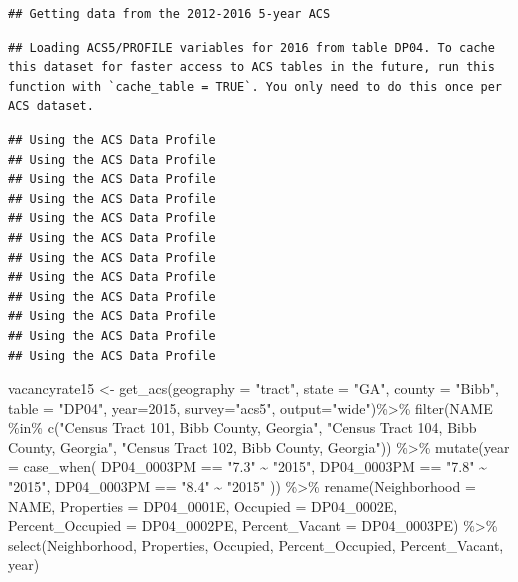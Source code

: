 \documentclass[
]{article}
\newenvironment{Shaded}{\begin{snugshade}}{\end{snugshade}}
\newcommand{\AttributeTok}[1]{\textcolor[rgb]{0.77,0.63,0.00}{#1}}
\newcommand{\DecValTok}[1]{\textcolor[rgb]{0.00,0.00,0.81}{#1}}
\newcommand{\FunctionTok}[1]{\textcolor[rgb]{0.00,0.00,0.00}{#1}}
\newcommand{\NormalTok}[1]{#1}
\newcommand{\OtherTok}[1]{\textcolor[rgb]{0.56,0.35,0.01}{#1}}
\newcommand{\SpecialCharTok}[1]{\textcolor[rgb]{0.00,0.00,0.00}{#1}}
\newcommand{\StringTok}[1]{\textcolor[rgb]{0.31,0.60,0.02}{#1}}
\begin{document}
\begin{verbatim}
## Getting data from the 2012-2016 5-year ACS
\end{verbatim}

\begin{verbatim}
## Loading ACS5/PROFILE variables for 2016 from table DP04. To cache this dataset for faster access to ACS tables in the future, run this function with `cache_table = TRUE`. You only need to do this once per ACS dataset.
\end{verbatim}

\begin{verbatim}
## Using the ACS Data Profile
## Using the ACS Data Profile
## Using the ACS Data Profile
## Using the ACS Data Profile
## Using the ACS Data Profile
## Using the ACS Data Profile
## Using the ACS Data Profile
## Using the ACS Data Profile
## Using the ACS Data Profile
## Using the ACS Data Profile
## Using the ACS Data Profile
## Using the ACS Data Profile
\end{verbatim}

\begin{Shaded}
\begin{Highlighting}[]
\NormalTok{vacancyrate15 }\OtherTok{\textless{}{-}} \FunctionTok{get\_acs}\NormalTok{(}\AttributeTok{geography =} \StringTok{"tract"}\NormalTok{, }\AttributeTok{state =} \StringTok{"GA"}\NormalTok{, }\AttributeTok{county =} \StringTok{"Bibb"}\NormalTok{, }\AttributeTok{table =} \StringTok{"DP04"}\NormalTok{,  }\AttributeTok{year=}\DecValTok{2015}\NormalTok{, }\AttributeTok{survey=}\StringTok{"acs5"}\NormalTok{, }\AttributeTok{output=}\StringTok{"wide"}\NormalTok{)}\SpecialCharTok{\%\textgreater{}\%}
\FunctionTok{filter}\NormalTok{(NAME }\SpecialCharTok{\%in\%} \FunctionTok{c}\NormalTok{(}\StringTok{"Census Tract 101, Bibb County, Georgia"}\NormalTok{, }\StringTok{"Census Tract 104, Bibb County, Georgia"}\NormalTok{, }\StringTok{"Census Tract 102, Bibb County, Georgia"}\NormalTok{)) }\SpecialCharTok{\%\textgreater{}\%}
  \FunctionTok{mutate}\NormalTok{(}\AttributeTok{year =} \FunctionTok{case\_when}\NormalTok{(}
\NormalTok{    DP04\_0003PM }\SpecialCharTok{==} \StringTok{"7.3"} \SpecialCharTok{\textasciitilde{}} \StringTok{"2015"}\NormalTok{,}
\NormalTok{    DP04\_0003PM }\SpecialCharTok{==} \StringTok{"7.8"} \SpecialCharTok{\textasciitilde{}} \StringTok{"2015"}\NormalTok{,}
\NormalTok{    DP04\_0003PM }\SpecialCharTok{==} \StringTok{"8.4"} \SpecialCharTok{\textasciitilde{}} \StringTok{"2015"}
\NormalTok{  )) }\SpecialCharTok{\%\textgreater{}\%}
  \FunctionTok{rename}\NormalTok{(}\AttributeTok{Neighborhood =}\NormalTok{ NAME,}
         \AttributeTok{Properties =}\NormalTok{ DP04\_0001E,}
         \AttributeTok{Occupied =}\NormalTok{ DP04\_0002E,}
         \AttributeTok{Percent\_Occupied =}\NormalTok{ DP04\_0002PE,}
         \AttributeTok{Percent\_Vacant =}\NormalTok{ DP04\_0003PE) }\SpecialCharTok{\%\textgreater{}\%}
   \FunctionTok{select}\NormalTok{(Neighborhood, Properties, Occupied, Percent\_Occupied, Percent\_Vacant, year) }
\end{Highlighting}
\end{Shaded}
\end{document}
